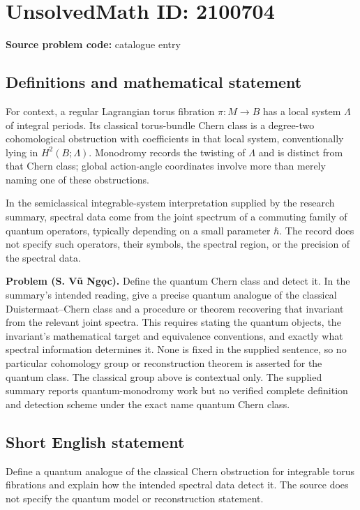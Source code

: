 \documentclass[11pt]{article}
\begin{document}
\section*{UnsolvedMath ID: 2100704}
\textbf{Source problem code:} catalogue entry
\subsection{Definitions and mathematical statement}
For context, a regular Lagrangian torus fibration $\pi:M\to B$ has a local system $\Lambda$ of integral periods. Its classical torus-bundle Chern class is a degree-two cohomological obstruction with coefficients in that local system, conventionally lying in $H^2(B;\Lambda)$. Monodromy records the twisting of $\Lambda$ and is distinct from that Chern class; global action-angle coordinates involve more than merely naming one of these obstructions.

In the semiclassical integrable-system interpretation supplied by the research summary, spectral data come from the joint spectrum of a commuting family of quantum operators, typically depending on a small parameter $\hbar$. The record does not specify such operators, their symbols, the spectral region, or the precision of the spectral data.

\textbf{Problem (S. Vũ Ngọc).} Define the quantum Chern class and detect it. In the summary's intended reading, give a precise quantum analogue of the classical Duistermaat--Chern class and a procedure or theorem recovering that invariant from the relevant joint spectra. This requires stating the quantum objects, the invariant's mathematical target and equivalence conventions, and exactly what spectral information determines it. None is fixed in the supplied sentence, so no particular cohomology group or reconstruction theorem is asserted for the quantum class. The classical group above is contextual only. The supplied summary reports quantum-monodromy work but no verified complete definition and detection scheme under the exact name quantum Chern class.
\subsection{Short English statement}
Define a quantum analogue of the classical Chern obstruction for integrable torus fibrations and explain how the intended spectral data detect it. The source does not specify the quantum model or reconstruction statement.
\end{document}
